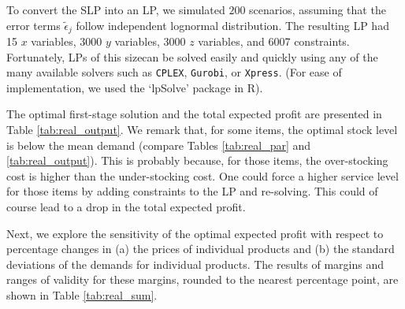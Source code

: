 \documentclass[a4paper,11pt]{article}
\begin{document}
To convert the SLP into an LP, we simulated $200$ scenarios, assuming that the error terms $\tilde{\epsilon}_j$ follow independent lognormal distribution. The resulting LP had 15 $x$ variables, 3000 $y$ variables, 3000 $z$ variables, and 6007 constraints. Fortunately, LPs of this sizecan be solved easily and quickly using any of the many available solvers such as  {\tt CPLEX}, {\tt Gurobi}, or {\tt Xpress}. (For ease of implementation, we used the `lpSolve' package in R).

The optimal first-stage solution and the total expected profit are presented in Table \ref{tab:real_output}. We remark that, for some items, the optimal stock level is below the mean demand (compare Tables \ref{tab:real_par} and \ref{tab:real_output}). This is probably because, for those items, the over-stocking cost is higher than the under-stocking cost. One could force a higher service level for those items by adding constraints to the LP and re-solving. This could of course lead to a drop in the total expected profit.

\begin{table}[htb]
\centering
\caption{Optimal first-stage solution and expected profit}
\label{tab:real_output}
\end{table}

Next, we explore the sensitivity of the optimal expected profit with respect to percentage changes in (a) the prices of individual products and (b) the standard deviations of the demands for individual products. The results of margins and ranges of validity for these margins, rounded to the nearest percentage point, are shown in Table \ref{tab:real_sum}.
\end{document}
